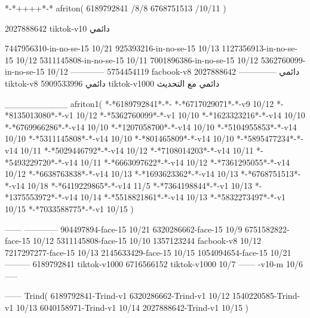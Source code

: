 *-*++++*-*
afriton(
6189792841 /8/8
6768751513 /10/11
)

2027888642 tiktok-v10
دائمي


7447956310-in-no-se-15 10/21
925393216-in-no-se-15 10/13
1127356913-in-no-se-15 10/12
5311145808-in-no-se-15 10/11
7001896386-in-no-se-15 10/12
5362760099-in-no-se-15 10/12
------------
5754454119 facbook-v8
دائمي
--------------
2027888642 tiktok-v8
دائمي
5909533996 tiktok-v1000
دائمي مع التحديث

__________
afriton1(
*-*6189792841*-*-
*-*6717029071*-*-v9 10/12
*-*8135013080‌*-*-v1 10/12
*-*5362760099*-*-v1 10/10
*-*1623323216*-*-v14 10/10
*-*6769966286*-*-v14 10/10
*-*1207058700*-*-v14 10/10
*-*5104955853*-*-v14 10/10
*-*5311145808*-*-v14 10/10
*-*801465809*-*-v14 10/10
*-*5895477234*-*-v14 10/11
*-*5029446792*-*-v14 10/12
*-*7108014203*-*-v14 10/11
*-*5493229720*-*-v14 10/11
*-*6663097622*-*-v14 10/12
*-*7361295055*-*-v14 10/12
*-*6638763838*-*-v14 10/13
*-*1693623362*-*-v14 10/13
*-*6768751513*-*-v14 10/18
*-*6419229865*-*-v14 11/5
*-*7364198844*-*-v1 10/13
*-*1375553972*-*-v14 10/14
*-*5518821861*-*-v14 10/13
*-*5832273497*-*-v1 10/15
*-*7033588775*-*-v1 10/15
)

------
------------
904497894-face-15 10/21
6320286662-face-15 10/9
6751582822-face-15 10/12
5311145808-face-15 10/10
1357123244 facbook-v8 10/12
7217297277-face-15 10/13
2145633429-face-15 10/15
1054094654-face-15 10/21
---------
6189792841 tiktok-v1000
6716566152 tiktok-v1000
10/7
------
-v10-m 10/6
-----

------
Trind(
6189792841-Trind-v1 
6320286662-Trind-v1 10/12
1540220585-Trind-v1 10/13
6040158971-Trind-v1 10/14
2027888642-Trind-v1 10/15
)
